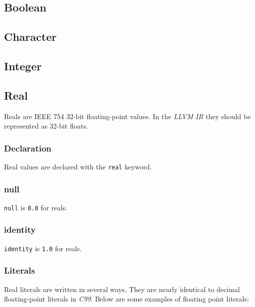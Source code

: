 \documentclass[../../gazprea.tex]{subfiles}
\begin{document}
\subsection{Boolean}
\label{ssec:boolean}


\subsection{Character}
\label{ssec:character}


\subsection{Integer}
\label{ssec:integer}


	\subsection{Real}\label{sec:real}

		Reals are IEEE 754 32-bit floating-point values. In the \textit{LLVM IR} they should be represented as 32-bit
		floats.

	\subsubsection{Declaration}

		Real values are declared with the \texttt{real} keyword.

	\subsubsection{null}

		\texttt{null} is \texttt{0.0} for reals.

	\subsubsection{identity}

		\texttt{identity} is \texttt{1.0} for reals.

	\subsubsection{Literals}
  \label{sssec:real_lit}

		Real literals are written in several ways. They are nearly identical to decimal floating-point literals in
		\textit{C99}. Below are some examples of floating point literals:
\end{document}
